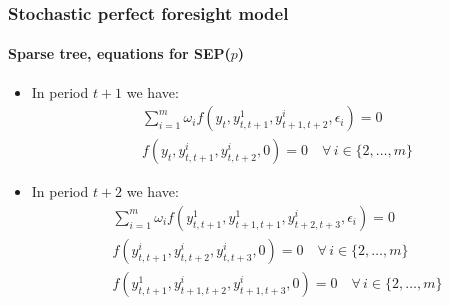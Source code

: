 \documentclass{beamer}
\begin{document}
\begin{frame}
   \frametitle{Stochastic perfect foresight model}
   \framesubtitle{Sparse tree, equations for SEP($p$)}

   \begin{itemize}

      \item In period $t+1$ we have:
            \[
               \begin{split}
                   & \sum_{i=1}^m\omega_i f\left( y_t, y_{t,t+1}^1, y_{t+1, t+2}^i, \epsilon_i \right) = 0 \\
                   & f\left(y_t, y_{t,t+1}^i, y_{t,t+2}^i, 0\right) = 0\quad \forall\, i\in\{2,\ldots,m\}
               \end{split}
            \]

            \medskip

      \item In period $t+2$ we have:
            \[
               \begin{split}
                   & \sum_{i=1}^m\omega_i f\left( y_{t,t+1}^1, y_{t+1,t+1}^1, y_{t+2, t+3}^i, \epsilon_i \right) = 0   \\
                   & f\left(y_{t,t+1}^i, y_{t,t+2}^i, y_{t,t+3}^i, 0\right) = 0\quad \forall\, i\in\{2,\ldots,m\}      \\
                   & f\left(y_{t,t+1}^1, y_{t+1,t+2}^i, y_{t+1, t+3}^i, 0\right) = 0\quad \forall\, i\in\{2,\ldots,m\} \\
               \end{split}
            \]

   \end{itemize}

\end{frame}
\end{document}
